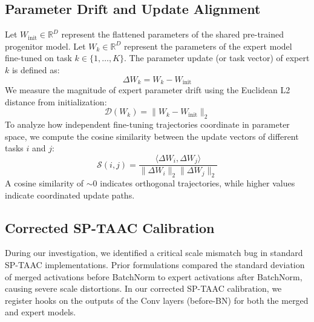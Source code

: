 \documentclass{article}
\theoremstyle{plain}
\theoremstyle{definition}
\theoremstyle{remark}
\begin{document}
\subsection{Parameter Drift and Update Alignment}
Let $W_{\text{init}} \in \mathbb{R}^D$ represent the flattened parameters of the shared pre-trained progenitor model. Let $W_k \in \mathbb{R}^D$ represent the parameters of the expert model fine-tuned on task $k \in \{1, \dots, K\}$. The parameter update (or task vector) of expert $k$ is defined as:
\begin{equation}
    \Delta W_k = W_k - W_{\text{init}}
\end{equation}
We measure the magnitude of expert parameter drift using the Euclidean L2 distance from initialization:
\begin{equation}
    \mathcal{D}(W_k) = \|W_k - W_{\text{init}}\|_2
\end{equation}
To analyze how independent fine-tuning trajectories coordinate in parameter space, we compute the cosine similarity between the update vectors of different tasks $i$ and $j$:
\begin{equation}
    \mathcal{S}(i, j) = \frac{\langle \Delta W_i, \Delta W_j \rangle}{\|\Delta W_i\|_2 \|\Delta W_j\|_2}
\end{equation}
A cosine similarity of $\sim 0$ indicates orthogonal trajectories, while higher values indicate coordinated update paths.

\subsection{Corrected SP-TAAC Calibration}
During our investigation, we identified a critical scale mismatch bug in standard SP-TAAC implementations. Prior formulations compared the standard deviation of merged activations before BatchNorm to expert activations after BatchNorm, causing severe scale distortions. In our corrected SP-TAAC calibration, we register hooks on the outputs of the Conv layers (before-BN) for both the merged and expert models.
\end{document}
